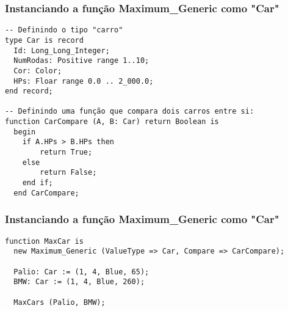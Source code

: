 \documentclass{beamer}
\begin{document}
    \begin{frame}[containsverbatim]
        \frametitle{Instanciando a função Maximum\_Generic como "Car"}
        \begin{verbatim}
-- Definindo o tipo "carro"
type Car is record
  Id: Long_Long_Integer;
  NumRodas: Positive range 1..10;
  Cor: Color;
  HPs: Floar range 0.0 .. 2_000.0;
end record;

-- Definindo uma função que compara dois carros entre si:
function CarCompare (A, B: Car) return Boolean is
  begin
    if A.HPs > B.HPs then
        return True;
    else
        return False;
    end if;
  end CarCompare;
        \end{verbatim}
    \end{frame}

    \begin{frame}[containsverbatim]
        \frametitle{Instanciando a função Maximum\_Generic como "Car"}
        \begin{verbatim}
function MaxCar is
  new Maximum_Generic (ValueType => Car, Compare => CarCompare);

  Palio: Car := (1, 4, Blue, 65);
  BMW: Car := (1, 4, Blue, 260);

  MaxCars (Palio, BMW);
        \end{verbatim}
    \end{frame}
\end{document}
